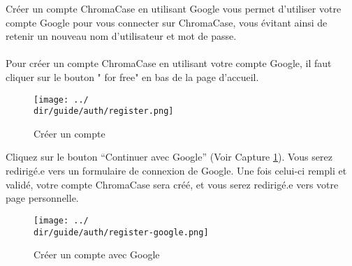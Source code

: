 Créer un compte ChromaCase en utilisant Google vous permet d’utiliser votre compte Google pour vous connecter sur ChromaCase, vous évitant ainsi de retenir un nouveau nom d’utilisateur et mot de passe.
\\\\
Pour créer un compte ChromaCase en utilisant votre compte Google, il faut cliquer sur le bouton " for free" en bas de la page d'accueil.

\begin{figure}[H]
	\texttt{[image: ../\\dir/guide/auth/register.png]}
	\caption{Créer un compte}
\end{figure}

Cliquez sur le bouton “Continuer avec Google” (Voir Capture \ref{fig:signup-google}). Vous serez redirigé.e vers un formulaire de connexion de Google. Une fois celui-ci rempli et validé, votre compte ChromaCase sera créé, et vous serez redirigé.e vers votre page personnelle.

\begin{figure}[H]
	\begin{center}
		\texttt{[image: ../\\dir/guide/auth/register-google.png]}
	\end{center}
	\caption{Créer un compte avec Google}
	\label{fig:signup-google}
\end{figure}